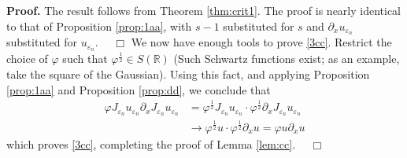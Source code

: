 \documentclass[12pt,reqno]{amsart}
\newcommand{\rr}{\mathbb{R}}
\newcommand{\p}{\partial}
\newcommand{\ee}{\varepsilon}
\newcommand{\vp}{\varphi}
\theoremstyle{plain}  %
\theoremstyle{definition}
\begin{document}
			{\bf Proof.} The result follows from Theorem \ref{thm:crit1}.
			The proof is nearly identical to that of
			Proposition \ref{prop:1aa}, with $s-1$ substituted for $s$
			and $\p_x u_{\ee_n}$ substituted for $u_{\ee_n}$. $\quad \Box$
			\vskip0.1in
			We now have enough tools to prove \eqref{3cc}. Restrict the
			choice of $\vp$ such that $\vp^\frac{1}{2} \in S(\rr)$
			(Such Schwartz functions exist; as an example, take the square
			of the Gaussian). Using this fact, and applying Proposition
			\ref{prop:1aa} and Proposition \ref{prop:dd}, we conclude that
			\begin{equation*}
				\begin{split}
					\vp J_{\ee_n} u_{\ee_n} \p_x J_{\ee_n} u_{\ee_n} 
					& = \vp^\frac{1}{2} J_{\ee_n} u_{\ee_n} \cdot
					\vp^\frac{1}{2} \p_x J_{\ee_n} u_{\ee_n}
					\\
					& \to \vp^\frac{1}{2} u \cdot \vp^\frac{1}{2} \p_x u = \vp
					u \p_x u
				\end{split}
			\end{equation*}
			which proves \eqref{3cc}, completing the proof of Lemma
			\ref{lem:cc}. $\quad \Box$
\end{document}
